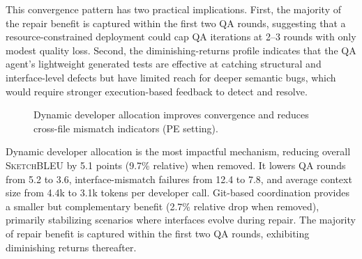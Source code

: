 \documentclass[format=acmsmall, review=false, screen=true]{acmart}
\newcommand{\tool}{\textsc{CodeTeam}\xspace}
\newcommand{\sketchbleu}{\textsc{SketchBLEU}\xspace}
\begin{document}
This convergence pattern has two practical implications.
First, the majority of the repair benefit is captured within the first two QA rounds, suggesting that a resource-constrained deployment could cap QA iterations at 2--3 rounds with only modest quality loss.
Second, the diminishing-returns profile indicates that the QA agent's lightweight generated tests are effective at catching structural and interface-level defects but have limited reach for deeper semantic bugs, which would require stronger execution-based feedback to detect and resolve.

\begin{figure}[t]
\centering
{}
\caption{Dynamic developer allocation improves convergence and reduces cross-file mismatch indicators (PE setting).}
\label{fig:rq3-effbars}
\end{figure}

\begin{rqsummary}[RQ3 Summary]
Dynamic developer allocation is the most impactful mechanism, reducing overall \sketchbleu by 5.1 points (9.7\% relative) when removed. It lowers QA rounds from 5.2 to 3.6, interface-mismatch failures from 12.4 to 7.8, and average context size from 4.4k to 3.1k tokens per developer call. Git-based coordination provides a smaller but complementary benefit (2.7\% relative drop when removed), primarily stabilizing scenarios where interfaces evolve during repair. The majority of repair benefit is captured within the first two QA rounds, exhibiting diminishing returns thereafter.
\end{rqsummary}
\end{document}

